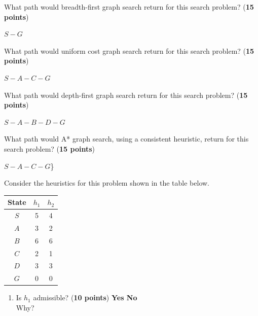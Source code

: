 \begin{enumerate}
  \item What path would breadth-first graph search return for this search problem? (\textbf{15 points})

  {\color{red} $S-G$}

\vspace{1cm}

  \item What path would uniform cost graph search return for this search problem? (\textbf{15 points})

  {\color{red} $S-A-C-G$}

\vspace{1cm}

  \item What path would depth-first graph search return for this search problem? (\textbf{15 points})

  {\color{red} $S-A-B-D-G$}

\vspace{1cm}

  \item What path would A* graph search, using a consistent heuristic, return for this search problem? (\textbf{15 points})

  {\color{red} $S-A-C-G$\}  

  \newpage

  \item Consider the heuristics for this problem shown in the table below.
  \begin{center}
  \begin{tabular}{|c|c|c|}
    \hline
    State & $h_1$ & $h_2$\\
    \hline
    $S$ & 5 & 4 \\
    \hline
    $A$ & 3 & 2 \\
    \hline
    $B$ & 6 & 6 \\
    \hline
    $C$ & 2 & 1 \\
    \hline
    $D$ & 3 & 3 \\
    \hline
    $G$ & 0 & 0 \\
    \hline
  \end{tabular}
  \end{center}
  \begin{enumerate}
      \item Is $h_1$ admissible? (\textbf{10 points}) \textbf{Yes \hspace{5pt} {\color{red} No}}\\
      Why?
      \vspace{2cm}


\end{enumerate}}
\end{enumerate}
